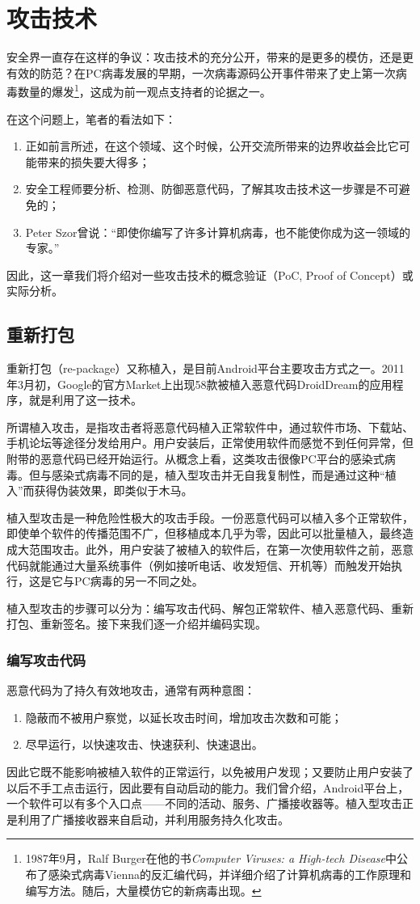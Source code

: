 \chapter{攻击技术}
安全界一直存在这样的争议：攻击技术的充分公开，带来的是更多的模仿，还是更有效的防范？在PC病毒发展的早期，一次病毒源码公开事件带来了史上第一次病毒数量的爆发\footnote{1987年9月，Ralf Burger在他的书\textit{Computer Viruses: a High-tech Disease}中公布了感染式病毒Vienna的反汇编代码，并详细介绍了计算机病毒的工作原理和编写方法。随后，大量模仿它的新病毒出现。}，这成为前一观点支持者的论据之一。

在这个问题上，笔者的看法如下：
\begin{enumerate}
  \item 正如前言所述，在这个领域、这个时候，公开交流所带来的边界收益会比它可能带来的损失要大得多；
  \item 安全工程师要分析、检测、防御恶意代码，了解其攻击技术这一步骤是不可避免的；
  \item Peter Szor曾说\cite{art_virus}：“即使你编写了许多计算机病毒，也不能使你成为这一领域的专家。”
\end{enumerate}

因此，这一章我们将介绍对一些攻击技术的概念验证（PoC, Proof of Concept）或实际分析。
\section{重新打包}
重新打包（re-package）又称植入，是目前Android平台主要攻击方式之一。2011年3月初，Google的官方Market上出现58款被植入恶意代码DroidDream的应用程序，就是利用了这一技术。

所谓植入攻击，是指攻击者将恶意代码植入正常软件中，通过软件市场、下载站、手机论坛等途径分发给用户。用户安装后，正常使用软件而感觉不到任何异常，但附带的恶意代码已经开始运行。从概念上看，这类攻击很像PC平台的感染式病毒。但与感染式病毒不同的是，植入型攻击并无自我复制性，而是通过这种“植入”而获得伪装效果，即类似于木马。

植入型攻击是一种危险性极大的攻击手段。一份恶意代码可以植入多个正常软件，即使单个软件的传播范围不广，但移植成本几乎为零，因此可以批量植入，最终造成大范围攻击。此外，用户安装了被植入的软件后，在第一次使用软件之前，恶意代码就能通过大量系统事件（例如接听电话、收发短信、开机等）而触发开始执行，这是它与PC病毒的另一不同之处。

植入型攻击的步骤可以分为：编写攻击代码、解包正常软件、植入恶意代码、重新打包、重新签名。接下来我们逐一介绍并编码实现。
\subsection{编写攻击代码}
恶意代码为了持久有效地攻击，通常有两种意图：
\begin{enumerate}
	\item 隐蔽而不被用户察觉，以延长攻击时间，增加攻击次数和可能；
	\item 尽早运行，以快速攻击、快速获利、快速退出。
\end{enumerate}
因此它既不能影响被植入软件的正常运行，以免被用户发现；又要防止用户安装了以后不手工点击运行，因此要有自动启动的能力。我们曾介绍，Android平台上，一个软件可以有多个入口点——不同的活动、服务、广播接收器等。植入型攻击正是利用了广播接收器来自启动，并利用服务持久化攻击。

